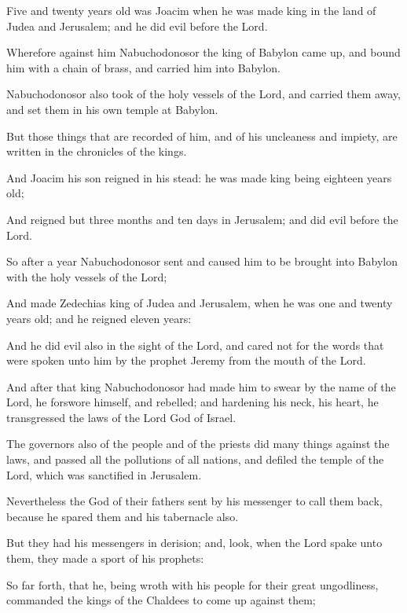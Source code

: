 {\par }{\PP {}Five and twenty years old was Joacim when he was made king in the land of Judea and Jerusalem; and he did evil before the Lord.
\par }{\PP {}Wherefore against him Nabuchodonosor the king of Babylon came up, and bound him with a chain of brass, and carried him into Babylon.
\par }{\PP {}Nabuchodonosor also took of the holy vessels of the Lord, and carried them away, and set them in his own temple at Babylon.
\par }{\PP {}But those things that are recorded of him, and of his uncleaness and impiety, are written in the chronicles of the kings.
\par }{\PP {}And Joacim his son reigned in his stead: he was made king being eighteen years old;
\par }{\PP {}And reigned but three months and ten days in Jerusalem; and did evil before the Lord.
\par }{\PP {}So after a year Nabuchodonosor sent and caused him to be brought into Babylon with the holy vessels of the Lord;
\par }{\PP {}And made Zedechias king of Judea and Jerusalem, when he was one and twenty years old; and he reigned eleven years:
\par }{\PP {}And he did evil also in the sight of the Lord, and cared not for the words that were spoken unto him by the prophet Jeremy from the mouth of the Lord.
\par }{\PP {}And after that king Nabuchodonosor had made him to swear by the name of the Lord, he forswore himself, and rebelled; and hardening his neck, his heart, he transgressed the laws of the Lord God of Israel.
\par }{\PP {}The governors also of the people and of the priests did many things against the laws, and passed all the pollutions of all nations, and defiled the temple of the Lord, which was sanctified in Jerusalem.
\par }{\PP {}Nevertheless the God of their fathers sent by his messenger to call them back, because he spared them and his tabernacle also.
\par }{\PP {}But they had his messengers in derision; and, look, when the Lord spake unto them, they made a sport of his prophets:
\par }{\PP {}So far forth, that he, being wroth with his people for their great ungodliness, commanded the kings of the Chaldees to come up against them;
}
